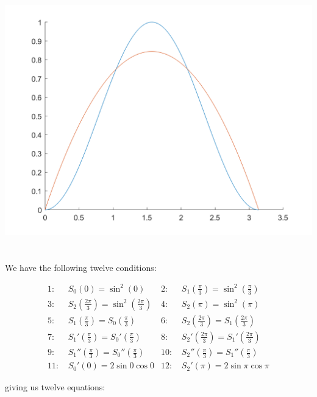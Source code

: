 \documentclass[11pt]{article}
\begin{document}
\includegraphics[scale=0.45]{q1b.png}


\section{} %
We have the following twelve conditions:

\begin{align*}
	\text{1: }&S_0(0)=\sin^2(0) & \text{2: }&S_1\left(\frac{\pi}{3}\right)=\sin^2\left(\frac{\pi}{3}\right)\\
	\text{3: }&S_2\left(\frac{2\pi}{3}\right)=\sin^2\left(\frac{2\pi}{3}\right) & \text{4: }&S_2(\pi)=\sin^2(\pi)\\
	\text{5: }&S_1\left(\frac{\pi}{3}\right)=S_0\left(\frac{\pi}{3}\right) & \text{6: }&S_2\left(\frac{2\pi}{3}\right)=S_1\left(\frac{2\pi}{3}\right)\\
	\text{7: }&S_1'\left(\frac{\pi}{3}\right)=S_0'\left(\frac{\pi}{3}\right) & \text{8: }&S_2'\left(\frac{2\pi}{3}\right)=S_1'\left(\frac{2\pi}{3}\right)\\
	\text{9: }&S_1''\left(\frac{\pi}{3}\right)=S_0''\left(\frac{\pi}{3}\right) & \text{10: }&S_2''\left(\frac{\pi}{3}\right)=S_1''\left(\frac{\pi}{3}\right)\\
	\text{11: }&S_0'(0)=2\sin0\cos0 & \text{12: }&S_2'(\pi)=2\sin\pi\cos\pi
\end{align*}

giving us twelve equations:
\end{document}
